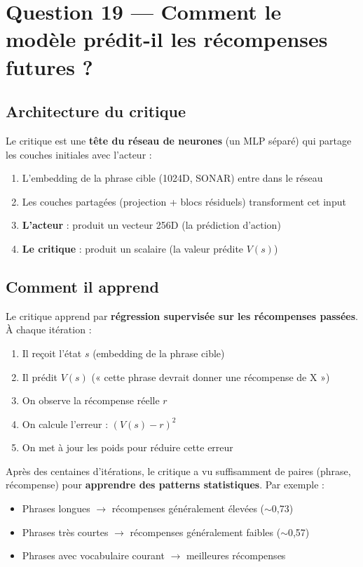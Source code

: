 \documentclass[11pt,a4paper]{article}
\begin{document}
\section{Question 19 — Comment le modèle prédit-il les récompenses futures ?}

\subsection{Architecture du critique}

Le critique est une \textbf{tête du réseau de neurones} (un MLP séparé) qui partage les couches initiales avec l'acteur :

\begin{enumerate}
    \item L'embedding de la phrase cible (1024D, SONAR) entre dans le réseau
    \item Les couches partagées (projection + blocs résiduels) transforment cet input
    \item \textbf{L'acteur} : produit un vecteur 256D (la prédiction d'action)
    \item \textbf{Le critique} : produit un scalaire (la valeur prédite $V(s)$)
\end{enumerate}

\subsection{Comment il apprend}

Le critique apprend par \textbf{régression supervisée sur les récompenses passées}. À chaque itération :

\begin{enumerate}
    \item Il reçoit l'état $s$ (embedding de la phrase cible)
    \item Il prédit $V(s)$ (« cette phrase devrait donner une récompense de X »)
    \item On observe la récompense réelle $r$
    \item On calcule l'erreur : $(V(s) - r)^2$
    \item On met à jour les poids pour réduire cette erreur
\end{enumerate}

Après des centaines d'itérations, le critique a vu suffisamment de paires (phrase, récompense) pour \textbf{apprendre des patterns statistiques}. Par exemple :
\begin{itemize}
    \item Phrases longues $\rightarrow$ récompenses généralement élevées ($\sim$0{,}73)
    \item Phrases très courtes $\rightarrow$ récompenses généralement faibles ($\sim$0{,}57)
    \item Phrases avec vocabulaire courant $\rightarrow$ meilleures récompenses
\end{itemize}
\end{document}
